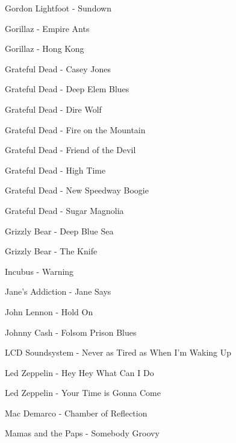 Gordon Lightfoot - Sundown \dotfill \pageref{Sundown - Gordon Lightfoot} 

Gorillaz - Empire Ants \dotfill \pageref{Empire Ants - Gorillaz} 

Gorillaz - Hong Kong \dotfill \pageref{Hong Kong - Gorillaz} 

Grateful Dead - Casey Jones \dotfill \pageref{Casey Jones - Grateful Dead} 

Grateful Dead - Deep Elem Blues \dotfill \pageref{Deep Elem Blues - Grateful Dead} 

Grateful Dead - Dire Wolf \dotfill \pageref{Dire Wolf - Grateful Dead} 

Grateful Dead - Fire on the Mountain \dotfill \pageref{Fire on the Mountain - Grateful Dead} 

Grateful Dead - Friend of the Devil \dotfill \pageref{Friend of the Devil - Grateful Dead} 

Grateful Dead - High Time \dotfill \pageref{High Time - Grateful Dead} 

Grateful Dead - New Speedway Boogie \dotfill \pageref{New Speedway Boogie - Grateful Dead} 

Grateful Dead - Sugar Magnolia \dotfill \pageref{Sugar Magnolia - Grateful Dead} 

Grizzly Bear - Deep Blue Sea \dotfill \pageref{Deep Blue Sea - Grizzly Bear} 

Grizzly Bear - The Knife \dotfill \pageref{The Knife - Grizzly Bear} 

Incubus - Warning \dotfill \pageref{Warning - Incubus} 

Jane's Addiction - Jane Says \dotfill \pageref{Jane Says - Jane's Addiction} 

John Lennon - Hold On \dotfill \pageref{Hold On - John Lennon} 

Johnny Cash - Folsom Prison Blues \dotfill \pageref{Folsom Prison Blues - Johnny Cash} 

LCD Soundsystem - Never as Tired as When I'm Waking Up \dotfill \pageref{Never as Tired as When I'm Waking Up - LCD Soundsystem} 

Led Zeppelin - Hey Hey What Can I Do \dotfill \pageref{Hey Hey What Can I Do - Led Zeppelin} 

Led Zeppelin - Your Time is Gonna Come \dotfill \pageref{Your Time is Gonna Come - Led Zeppelin} 

Mac Demarco - Chamber of Reflection \dotfill \pageref{Chamber of Reflection - Mac Demarco} 

Mamas and the Paps - Somebody Groovy \dotfill \pageref{Somebody Groovy - Mamas and the Paps} 

